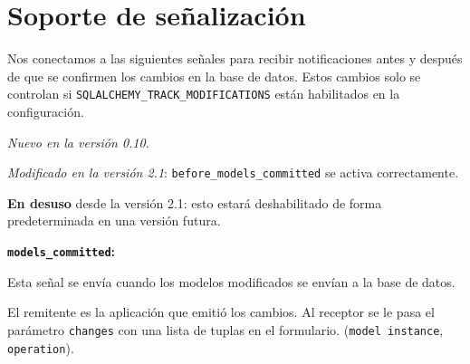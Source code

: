 \documentclass[10pt,letterpaper,notumble]{leaflet}
\begin{document}
{\begin{minipage}{2.2\linewidth}
		    \vspace*{-0.4cm}
		    
		    \section{Soporte de señalización}
		    
		    Nos conectamos a las siguientes señales para recibir notificaciones antes y después de que se confirmen los cambios en la base de datos. Estos cambios solo se controlan si \texttt{SQLALCHEMY\_TRACK\_MODIFICATIONS} están habilitados en la configuración.
		    
		    \textit{Nuevo en la versión 0.10}.
		    
		    \textit{Modificado en la versión 2.1}: \texttt{before\_models\_committed} se activa correctamente.
		    
		    \textbf{En desuso} desde la versión 2.1: esto estará deshabilitado de forma predeterminada en una versión futura.
		    
		    \textbf{\texttt{models\_committed}:}
		    
		    Esta señal se envía cuando los modelos modificados se envían a la base de datos.
		    
		    El remitente es la aplicación que emitió los cambios. Al receptor se le pasa el parámetro \texttt{changes} con una lista de tuplas en el formulario. (\texttt{model instance}, \texttt{operation}).
		    
		\end{minipage}
		
	}
	
\end{document}
